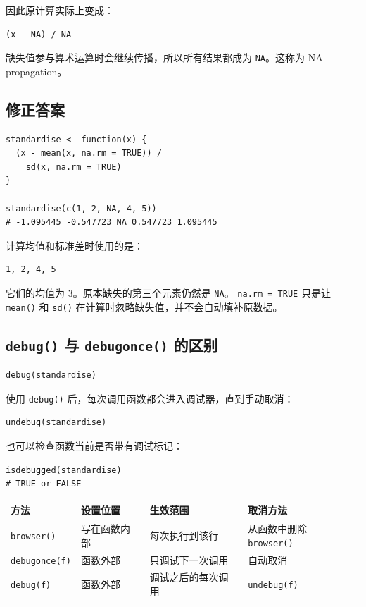 \documentclass[11pt,a4paper]{ctexart}
\begin{document}
因此原计算实际上变成：

\begin{lstlisting}[style=rcode]
(x - NA) / NA
\end{lstlisting}

缺失值参与算术运算时会继续传播，所以所有结果都成为
\lstinline|NA|。这称为 NA propagation。

\subsection{修正答案}

\begin{lstlisting}[style=rcode]
standardise <- function(x) {
  (x - mean(x, na.rm = TRUE)) /
    sd(x, na.rm = TRUE)
}

standardise(c(1, 2, NA, 4, 5))
# -1.095445 -0.547723 NA 0.547723 1.095445
\end{lstlisting}

计算均值和标准差时使用的是：

\begin{lstlisting}[style=textcode]
1, 2, 4, 5
\end{lstlisting}

它们的均值为 3。原本缺失的第三个元素仍然是 \lstinline|NA|。
\lstinline|na.rm = TRUE| 只是让 \lstinline|mean()| 和 \lstinline|sd()|
在计算时忽略缺失值，并不会自动填补原数据。

\subsection{\texttt{debug()} 与 \texttt{debugonce()} 的区别}

\begin{lstlisting}[style=rcode]
debug(standardise)
\end{lstlisting}

使用 \lstinline|debug()| 后，每次调用函数都会进入调试器，直到手动取消：

\begin{lstlisting}[style=rcode]
undebug(standardise)
\end{lstlisting}

也可以检查函数当前是否带有调试标记：

\begin{lstlisting}[style=rcode]
isdebugged(standardise)
# TRUE or FALSE
\end{lstlisting}

\begin{longtable}{p{}p{}p{}p{}}
\toprule
方法 & 设置位置 & 生效范围 & 取消方法 \\
\midrule
\endhead
\lstinline|browser()| & 写在函数内部 & 每次执行到该行 & 从函数中删除 \lstinline|browser()| \\
\lstinline|debugonce(f)| & 函数外部 & 只调试下一次调用 & 自动取消 \\
\lstinline|debug(f)| & 函数外部 & 调试之后的每次调用 & \lstinline|undebug(f)| \\
\bottomrule
\end{longtable}
\end{document}
